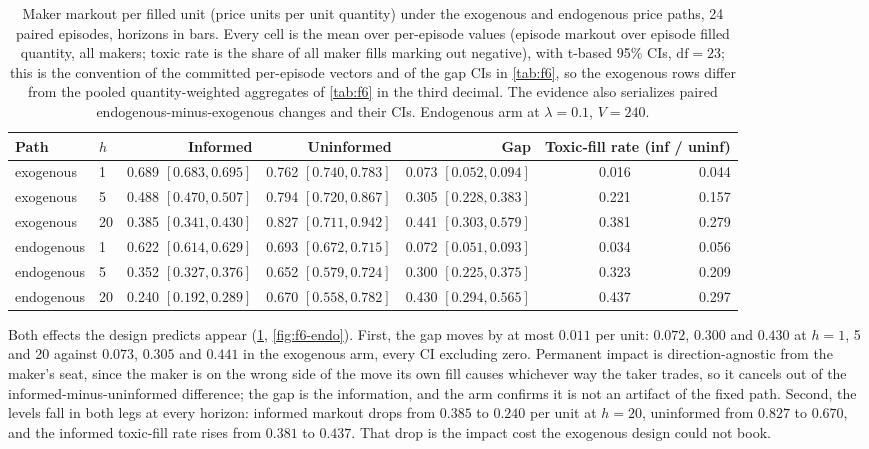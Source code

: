 \begin{table}[t]
\centering
\caption{Maker markout per filled unit (price units per unit quantity) under the exogenous and endogenous price paths, 24 paired episodes, horizons in bars. Every cell is the mean over per-episode values (episode markout over episode filled quantity, all makers; toxic rate is the share of all maker fills marking out negative), with t-based 95\% CIs, $\mathrm{df}=23$; this is the convention of the committed per-episode vectors and of the gap CIs in \cref{tab:f6}, so the exogenous rows differ from the pooled quantity-weighted aggregates of \cref{tab:f6} in the third decimal. The evidence also serializes paired endogenous-minus-exogenous changes and their CIs. Endogenous arm at $\lambda = 0.1$, $V = 240$.}
\label{tab:f6-endo}
\footnotesize
\setlength{\tabcolsep}{3.5pt}
\begin{tabular}{llrrrrr}
\toprule
Path & $h$ & Informed & Uninformed & Gap & \multicolumn{2}{c}{Toxic-fill rate (inf / uninf)} \\
\midrule
exogenous  & 1  & 0.689 $[0.683, 0.695]$ & 0.762 $[0.740, 0.783]$ & 0.073 $[0.052, 0.094]$ & 0.016 & 0.044 \\
exogenous  & 5  & 0.488 $[0.470, 0.507]$ & 0.794 $[0.720, 0.867]$ & 0.305 $[0.228, 0.383]$ & 0.221 & 0.157 \\
exogenous  & 20 & 0.385 $[0.341, 0.430]$ & 0.827 $[0.711, 0.942]$ & 0.441 $[0.303, 0.579]$ & 0.381 & 0.279 \\
\midrule
endogenous & 1  & 0.622 $[0.614, 0.629]$ & 0.693 $[0.672, 0.715]$ & 0.072 $[0.051, 0.093]$ & 0.034 & 0.056 \\
endogenous & 5  & 0.352 $[0.327, 0.376]$ & 0.652 $[0.579, 0.724]$ & 0.300 $[0.225, 0.375]$ & 0.323 & 0.209 \\
endogenous & 20 & 0.240 $[0.192, 0.289]$ & 0.670 $[0.558, 0.782]$ & 0.430 $[0.294, 0.565]$ & 0.437 & 0.297 \\
\bottomrule
\end{tabular}
\end{table}

Both effects the design predicts appear (\cref{tab:f6-endo}, \cref{fig:f6-endo}). First, the gap moves by at most $0.011$ per unit: $0.072$, $0.300$ and $0.430$ at $h = 1$, 5 and 20 against $0.073$, $0.305$ and $0.441$ in the exogenous arm, every CI excluding zero. Permanent impact is direction-agnostic from the maker's seat, since the maker is on the wrong side of the move its own fill causes whichever way the taker trades, so it cancels out of the informed-minus-uninformed difference; the gap is the information, and the arm confirms it is not an artifact of the fixed path. Second, the levels fall in both legs at every horizon: informed markout drops from $0.385$ to $0.240$ per unit at $h = 20$, uninformed from $0.827$ to $0.670$, and the informed toxic-fill rate rises from $0.381$ to $0.437$. That drop is the impact cost the exogenous design could not book.

